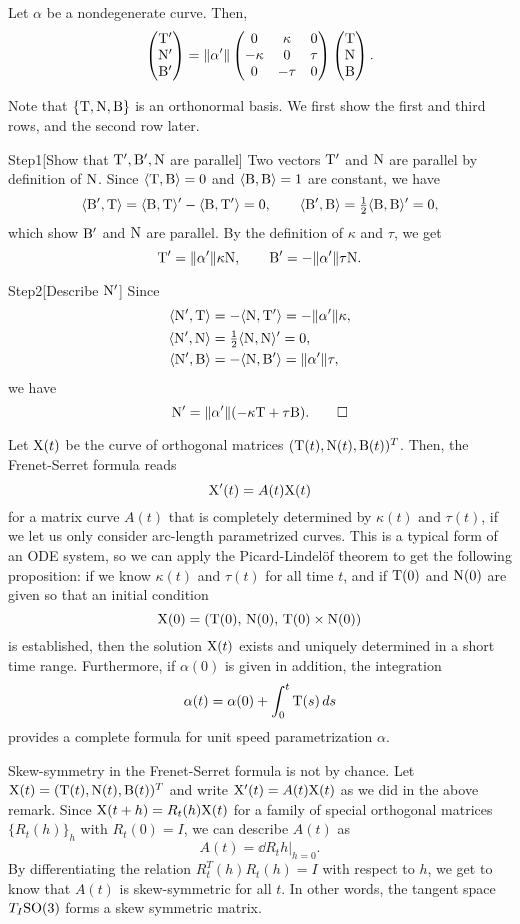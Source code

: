 \documentclass{../../large}
\def\a{\alpha}
\def\Step{Step}
\begin{document}
\begin{thm}
Let $\a$ be a nondegenerate curve.
Then,
\[\mat{\rT'\\\rN'\\\rB'}=\|\a'\|\mat{0&\kappa&0\\-\kappa&0&\tau\\0&-\tau&0}\mat{\rT\\\rN\\\rB}.\]
\end{thm}
\begin{pf}
Note that $\{\mathrm{T},\mathrm{N},\mathrm{B}\}$ is an orthonormal basis.
We first show the first and third rows, and the second row later.

\Step{1}[Show that $\mathrm{T}',\mathrm{B}',\mathrm{N}$ are parallel]
Two vectors $\mathrm{T}'$ and $\mathrm{N}$ are parallel by definition of $\mathrm{N}$.
Since $\langle\mathrm{T},\mathrm{B}\rangle=0$ and $\langle\mathrm{B},\mathrm{B}\rangle=1$ are constant, we have
\[\langle\mathrm{B}',\mathrm{T}\rangle=\langle\mathrm{B},\mathrm{T}\rangle'-\langle\mathrm{B},\mathrm{T}'\rangle=0,\qquad\langle\mathrm{B}',\mathrm{B}\rangle=\tfrac12\langle\mathrm{B},\mathrm{B}\rangle'=0,\]
which show $\mathrm{B}'$ and $\mathrm{N}$ are parallel.
By the definition of $\kappa$ and $\tau$, we get
\[\rT'=\|\a'\|\kappa\rN,\qquad\rB'=-\|\a'\|\tau\rN.\]

\Step{2}[Describe $\mathrm{N}'$]
Since
\begin{align*}
\<\rN',\rT\>&=-\<\rN,\rT'\>=-\|\a'\|\kappa,\\
\<\rN',\rN\>&=\tfrac12\<\rN,\rN\>'=0,\\
\<\rN',\rB\>&=-\<\rN,\rB'\>=\|\a'\|\tau,
\end{align*}
we have
\[\rN'=\|\a'\|(-\kappa\rT+\tau\rB).\qedhere\]
\end{pf}
\begin{rmk}
Let $\mathrm{X}(t)$ be the curve of orthogonal matrices $(\mathrm{T}(t),\mathrm{N}(t),\mathrm{B}(t))^T$.
Then, the Frenet-Serret formula reads
\[\mathrm{X}'(t)=A(t)\mathrm{X}(t)\]
for a matrix curve $A(t)$ that is completely determined by $\kappa(t)$ and $\tau(t)$, if we let us only consider arc-length parametrized curves.
This is a typical form of an ODE system, so we can apply the Picard-Lindel\"of theorem to get the following proposition: if we know $\kappa(t)$ and $\tau(t)$ for all time $t$, and if $\mathrm{T}(0)$ and $\mathrm{N}(0)$ are given so that an initial condition
\[\mathrm{X}(0)=(\mathrm{T}(0),\,\mathrm{N}(0),\,\mathrm{T}(0)\times\mathrm{N}(0))\]
is established, then the solution $\mathrm{X}(t)$ exists and uniquely determined in a short time range.
Furthermore, if $\a(0)$ is given in addition, the integration
\[\a(t)=\a(0)+\int_0^t\rT(s)\,ds\]
provides a complete formula for unit speed parametrization $\a$.
\end{rmk}
\begin{rmk}
Skew-symmetry in the Frenet-Serret formula is not by chance.
Let $\mathrm{X}(t)=(\mathrm{T}(t),\mathrm{N}(t),\mathrm{B}(t))^T$ and write $\mathrm{X}'(t)=A(t)\mathrm{X}(t)$ as we did in the above remark.
Since $\mathrm{X}(t+h)=R_t(h)\mathrm{X}(t)$ for a family of special orthogonal matrices $\{R_t(h)\}_h$ with $R_t(0)=I$, we can describe $A(t)$ as 
\[A(t)=\left.\dd{R_t}{h}\right\rvert_{h=0}.\]
By differentiating the relation $R_t^T(h)R_t(h)=I$ with respect to $h$, we get to know that $A(t)$ is skew-symmetric for all $t$.
In other words, the tangent space $T_I\mathrm{SO}(3)$ forms a skew symmetric matrix.
\end{rmk}
\end{document}
